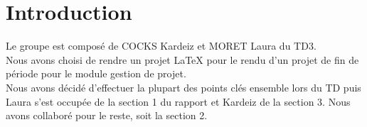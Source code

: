 \section{Introduction}

Le groupe est composé de COCKS Kardeiz et MORET Laura du TD3.\\
Nous avons choisi de rendre un projet \LaTeX{} pour le rendu d'un projet de fin de période pour le module gestion de projet.\\
Nous avons décidé d'effectuer la plupart des points clés ensemble lors du TD puis Laura s'est occupée de la section 1 du rapport et Kardeiz de la section 3. Nous avons collaboré pour le reste, soit la section 2.